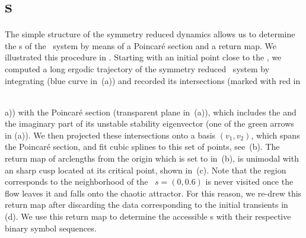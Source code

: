 \section{\Po s}
\label{s:numerics}

The simple structure of the symmetry reduced dynamics allows us to
determine the \rpo s of the \twomode\ system by means of a Poincar\'e
section and a return map. We illustrated this procedure in
. Starting with an initial point close to the
\REQV{}{}, we computed a long ergodic trajectory of the symmetry reduced
\twomode\ system by integrating  (blue curve in
\,(a)) and recorded its intersections (marked
with red in \,{a)) with the Poincar\'e section
(transparent plane in \,(a)), which includes
the \REQV{}{} and the imaginary part of its unstable stability
eigenvector (one of the green arrows in (a)).
We then projected these intersections onto a basis $(v_1, v_2)$, which
spans the Poincar\'e section, and fit cubic splines to this set of
points, see \,(b). The return map of arclengths
from the origin which is set to \REQV{}{} in
\,(b), is unimodal with an sharp cusp located at its critical point, shown
in \,(c). Note that the region corresponds to
the neighborhood of the \reqv\ $s = (0, 0.6)$ is never visited once the
flow leaves it and falls onto the chaotic attractor. For this reason, we
re-drew this return map after discarding the data corresponding to the
initial transients in \,(d). We use this return
map to determine the accessible \rpo s  with their respective binary
symbol sequences.

}
